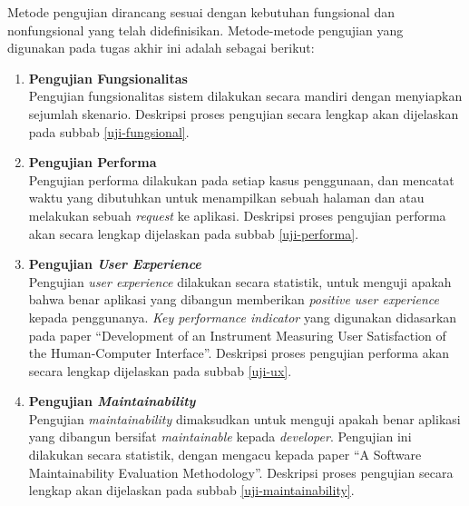 	
	Metode pengujian dirancang sesuai dengan kebutuhan fungsional dan nonfungsional yang telah didefinisikan. Metode-metode pengujian yang digunakan pada tugas akhir ini adalah sebagai berikut:
	
	\begin{enumerate}
	\item \textbf{Pengujian Fungsionalitas} \\
	Pengujian fungsionalitas sistem dilakukan secara mandiri dengan menyiapkan sejumlah skenario. Deskripsi proses pengujian secara lengkap akan dijelaskan pada subbab \ref{uji-fungsional}.
	
	\item \textbf{Pengujian Performa}\\
	Pengujian performa dilakukan pada setiap kasus penggunaan, dan mencatat waktu yang dibutuhkan untuk menampilkan sebuah halaman dan atau melakukan sebuah \textit{request} ke aplikasi. Deskripsi proses pengujian performa akan secara lengkap dijelaskan pada subbab \ref{uji-performa}.
	
	\item \textbf{Pengujian \textit{User Experience}} \\
	Pengujian \textit{user experience} dilakukan secara statistik, untuk menguji apakah bahwa benar aplikasi yang dibangun memberikan \textit{positive user experience} kepada penggunanya. \textit{Key performance indicator} yang digunakan didasarkan pada paper ``Development of an Instrument Measuring User Satisfaction of the Human-Computer Interface''. Deskripsi proses pengujian performa akan secara lengkap dijelaskan pada subbab \ref{uji-ux}.
	
	\item \textbf{Pengujian \textit{Maintainability}} \\
	Pengujian \textit{maintainability} dimaksudkan untuk menguji apakah benar aplikasi yang dibangun bersifat \textit{maintainable} kepada \textit{developer}. Pengujian ini dilakukan secara statistik, dengan mengacu kepada paper ``A Software Maintainability Evaluation Methodology''. Deskripsi proses pengujian secara lengkap akan dijelaskan pada subbab \ref{uji-maintainability}.
	\end{enumerate}
